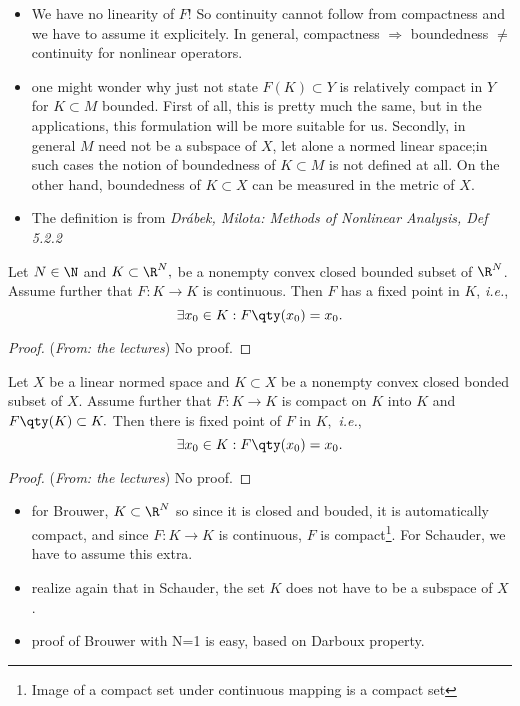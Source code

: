 \begin{remark}

	\begin{itemize}
		\item	We have no linearity of $F$! So continuity cannot follow from compactness and we have to assume it explicitely. In general, compactness $\Rightarrow $ boundedness $\neq$ continuity for nonlinear operators.
		\item one might wonder why just not state $F(K) \subset Y$ is relatively compact in $Y$ for $K \subset M $ bounded. First of all, this is pretty much the same, but in the applications, this formulation will be more suitable for us. Secondly, in general $M$ need not be a subspace of $X$, let alone a normed linear space;in such cases the notion of boundedness of $K \subset M$ is not defined at all. On the other hand, boundedness of $K \subset X$ can be measured in the metric of $X.$
		\item	The definition is from \textit{Drábek, Milota: Methods of Nonlinear Analysis, Def 5.2.2}
	\end{itemize}
\end{remark}

\begin{theorem}
	Let $N \in \N$ and $K \subset \R^N,$ be a nonempty convex closed bounded subset of $\R^{N}$. Assume further that $F: K \to K$ is continuous. Then $F$ has a fixed point in $K$, \textit{i.e.},
	\[
		\exists x_0 \in K: F\qty(x_{0}) = x_0.
	\]
\end{theorem}

\begin{proof}(\textit{From: the lectures})
	No proof.
\end{proof}

\begin{theorem}
	Let $X$ be a linear normed space and $K \subset X$ be a nonempty convex closed bonded subset of $X$. Assume further that $F: K \to K$ is compact on $K$ into $K$ and $F\qty(K) \subset K.$ Then there is fixed point of $F$ in $K,$ \textit{i.e.},
	\[
		\exists x_0 \in K: F\qty(x_0) = x_0.
	\]
\end{theorem}

\begin{proof}(\textit{From: the lectures})
	No proof.
\end{proof}

\begin{remark}
\begin{itemize}
	\item for Brouwer, $K \subset \R^N$ so since it is closed and bouded, it is automatically compact, and since $F: K \to K$ is continuous, $F$ is compact\footnote{Image of a compact set under continuous mapping is a compact set}. For Schauder, we have to assume this extra.
	\item realize again that in Schauder, the set $K$ does not have to be a subspace of $X$.
	\item proof of Brouwer with N=1 is easy, based on Darboux property.
\end{itemize}
\end{remark}

